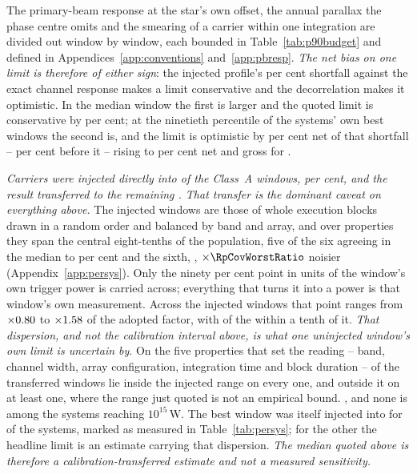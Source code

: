 The primary-beam response at the star's own offset, the annual parallax the
phase centre omits and the smearing of a carrier within one integration are
divided out window by window, each bounded in Table~\ref{tab:p90budget} and
defined in Appendices~\ref{app:conventions} and~\ref{app:pbresp}. \emph{The
net bias on one limit is therefore of either sign}: the injected
profile's \InjShortPct{} per cent shortfall against the exact channel response
makes a limit conservative and the decorrelation makes it optimistic. In the
median window the first is larger and the quoted limit is conservative by
\NmNetConsPct{} per cent; at the ninetieth percentile of the systems' own best
windows the second is, and the limit is optimistic by \NmNetOptPct{} per cent
net of that shortfall -- \NmDecSysHiPct{} per cent before it -- rising to
\NmNetOptMaxPct{} per cent net and \NmDecSysWorstPct{} gross for
\NmDecSysWorstName{}.

\emph{Carriers were injected directly into \SensNInj{} of the \NWinA{} Class~A
windows, \SensNInjPct{} per cent, and the result transferred to the remaining
\SensNTransfer. That transfer is the dominant caveat on everything above.} The
injected windows are those of whole execution blocks drawn in a random order
and balanced by band and array, and over \RpNAxis{} properties they span the
central eight-tenths of the population, five of the six agreeing in the median
to \RpCovOtherPct{} per cent and the sixth, \RpCovWorstAxis,
$\times\RpCovWorstRatio$ noisier (Appendix~\ref{app:persys}). Only the ninety
per cent point in units of the window's own trigger power is carried across;
everything that turns it into a power is that window's own measurement. Across the injected windows that point ranges from
$\times0.80$ to $\times1.58$ of the adopted factor, with
\NmDispNTenth{} of the \SensNInj{} within a tenth of it. \emph{That
dispersion, and not the calibration interval above, is what one uninjected
window's own limit is uncertain by}. On the five properties that set the
reading -- band, channel width, array configuration, integration time and
block duration -- \NgNInterpWin{} of the \SensNTransfer{} transferred windows
lie inside the injected range on every one, and \NgNExtrapWin{} outside it on
at least one, where the range just quoted is not an empirical bound.
\NgExtrapTakeClause{}, and none is among the \NSysEfifteen{} systems reaching
$10^{15}$\,W. The best window was
itself injected into for \SmcNMeasSys{} of the \NSysALim{} systems, marked as
measured in Table~\ref{tab:persys}; for the other \SmcNEstSys{} the headline
limit is an estimate carrying that dispersion. \emph{The median quoted above
is therefore a calibration-transferred estimate and not a measured
sensitivity.}

